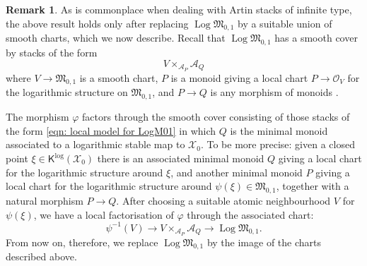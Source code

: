 \documentclass[11pt]{amsart}
\theoremstyle{definition}
\theoremstyle{definition}
\newtheorem{remark}[theorem]{Remark}
\newcommand{\OO}{\mathcal{O}}
\newcommand{\Acal}{\mathcal{A}}
\newcommand{\Xcal}{\mathcal{X}}
\newcommand{\Mfrak}{\mathfrak{M}}
\newcommand{\Kup}{\mathsf{K}}
\newcommand{\Log}{\operatorname{Log}}
\begin{document}

\begin{remark} As is commonplace when dealing with Artin stacks of infinite type, the above result holds only after replacing $\Log\Mfrak_{0,1}$ by a suitable union of smooth charts, which we now describe. Recall that $\Log\Mfrak_{0,1}$ has a smooth cover by stacks of the form
\begin{equation}\label{eqn: local model for LogM01} V \times_{\Acal_P} \Acal_Q \end{equation}
where $V \to \Mfrak_{0,1}$ is a smooth chart, $P$ is a monoid giving a local chart $P \to \OO_V$ for the logarithmic structure on $\Mfrak_{0,1}$, and $P \to Q$ is any morphism of monoids \cite[Corollary~5.25 and Remark~5.26]{OlssonLogStacks}. 

The morphism $\varphi$ factors through the smooth cover consisting of those stacks of the form \eqref{eqn: local model for LogM01} in which $Q$ is the minimal monoid associated to a logarithmic stable map to $\Xcal_0$. To be more precise: given a closed point $\xi \in \Kup^{\log}(\Xcal_0)$ there is an associated minimal monoid $Q$ giving a local chart for the logarithmic structure around $\xi$, and another minimal monoid $P$ giving a local chart for the logarithmic structure around $\psi(\xi) \in \Mfrak_{0,1}$, together with a natural morphism $P \to Q$. After choosing a suitable atomic neighbourhood $V$ for $\psi(\xi)$, we have a local factorisation of $\varphi$ through the associated chart:
\begin{equation*} \psi^{-1}(V) \to V \times_{\Acal_P} \Acal_Q \to \Log\Mfrak_{0,1}.\end{equation*}
From now on, therefore, we replace $\Log\Mfrak_{0,1}$ by the image of the charts described above. \end{remark}
\end{document}
